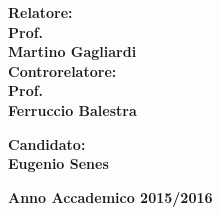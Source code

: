\begin{titlepage}
\begin{minipage}[t]{0.47\textwidth}
{\large{\bf Relatore:\\
Prof.\\
Martino Gagliardi}}
\vspace{8mm}
{\large{\bf \\ Controrelatore:\\
Prof.\\
Ferruccio Balestra}}
\end{minipage}
\hfill
\begin{minipage}[t]{0.47\textwidth}\raggedleft
\vspace{20mm}
{\large{\bf Candidato:\\
Eugenio Senes}}
\end{minipage}
\vspace{10mm}
\begin{center}
{\large{\bf 
Anno Accademico 2015/2016}}
\end{center}

\end{titlepage}